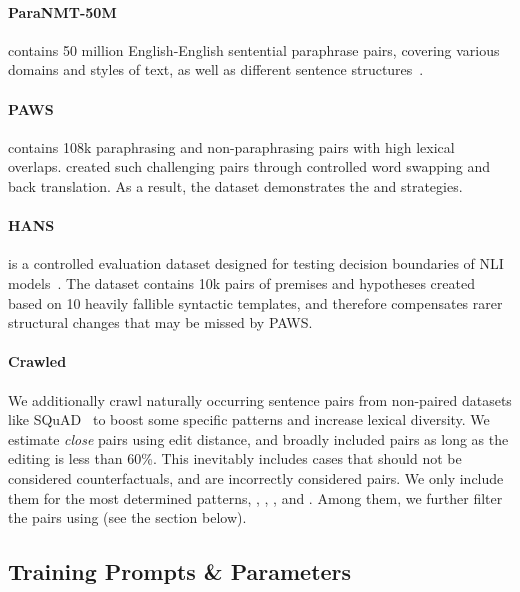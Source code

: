 \paragraph{ParaNMT-50M} contains 50 million English-English sentential paraphrase pairs, covering various domains and styles of text, as well as different sentence structures~\cite{wieting2017paranmt}. 

\paragraph{PAWS} contains 108k paraphrasing and non-paraphrasing pairs with high lexical overlaps. 
\citet{zhang2019paws} created such challenging pairs through controlled word swapping and back translation.
As a result, the dataset demonstrates the  and  strategies.


\paragraph{HANS} is a controlled evaluation dataset designed for testing decision boundaries of NLI models~\cite{mccoy2019right}. 
The dataset contains 10k pairs of premises and hypotheses created based on 10 heavily fallible syntactic templates, and therefore compensates rarer structural changes that may be missed by PAWS.


\paragraph{Crawled} 
We additionally crawl naturally occurring sentence pairs from non-paired datasets like SQuAD~\cite{rajpurkar-etal-2016-squad} to boost some specific patterns and increase lexical diversity. 
We estimate \emph{close} pairs using edit distance, and broadly included pairs as long as the editing is less than 60\%.
This inevitably includes cases that should not be considered counterfactuals,\eg {} and  are incorrectly considered  pairs. 
We only include them for the most determined patterns, \ie {}, , , and .
Among them, we further filter the pairs using \tagstrs (see the section below).


\subsection{Training Prompts \& Parameters}

